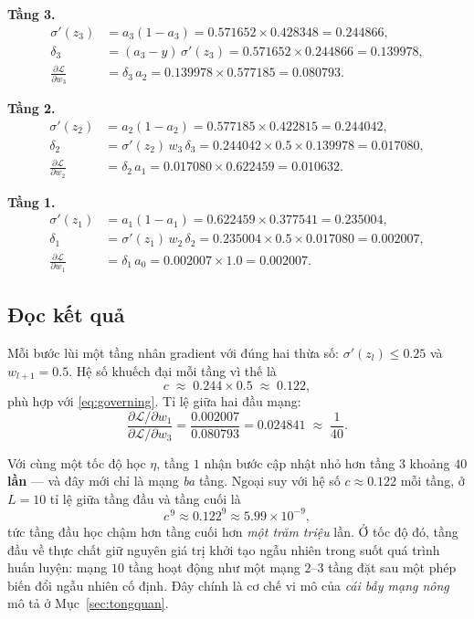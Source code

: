 \medskip
\noindent\textbf{Tầng 3.}
\begin{align*}
  \sigma'(z_3) &= a_3(1-a_3) = 0.571652\times 0.428348 = 0.244866,\\
  \delta_3 &= (a_3 - y)\,\sigma'(z_3) = 0.571652\times 0.244866 = 0.139978,\\
  \frac{\partial\mathcal{L}}{\partial w_3} &= \delta_3\, a_2
    = 0.139978\times 0.577185 = 0.080793 .
\end{align*}

\noindent\textbf{Tầng 2.}
\begin{align*}
  \sigma'(z_2) &= a_2(1-a_2) = 0.577185\times 0.422815 = 0.244042,\\
  \delta_2 &= \sigma'(z_2)\, w_3\, \delta_3
    = 0.244042\times 0.5\times 0.139978 = 0.017080,\\
  \frac{\partial\mathcal{L}}{\partial w_2} &= \delta_2\, a_1
    = 0.017080\times 0.622459 = 0.010632 .
\end{align*}

\noindent\textbf{Tầng 1.}
\begin{align*}
  \sigma'(z_1) &= a_1(1-a_1) = 0.622459\times 0.377541 = 0.235004,\\
  \delta_1 &= \sigma'(z_1)\, w_2\, \delta_2
    = 0.235004\times 0.5\times 0.017080 = 0.002007,\\
  \frac{\partial\mathcal{L}}{\partial w_1} &= \delta_1\, a_0
    = 0.002007\times 1.0 = 0.002007 .
\end{align*}

\subsection{Đọc kết quả}

Mỗi bước lùi một tầng nhân gradient với đúng hai thừa số: $\sigma'(z_l) \le 0.25$
và $w_{l+1} = 0.5$. Hệ số khuếch đại mỗi tầng vì thế là
\[
  c \;\approx\; 0.244 \times 0.5 \;\approx\; 0.122 ,
\]
phù hợp với \eqref{eq:governing}. Tỉ lệ giữa hai đầu mạng:
\[
  \frac{\partial\mathcal{L}/\partial w_1}{\partial\mathcal{L}/\partial w_3}
  = \frac{0.002007}{0.080793}
  = 0.024841
  \;\approx\; \frac{1}{40} .
\]

Với cùng một tốc độ học $\eta$, tầng $1$ nhận bước cập nhật nhỏ hơn tầng $3$
khoảng \textbf{$40$ lần} --- và đây mới chỉ là mạng \emph{ba} tầng. Ngoại suy với
hệ số $c \approx 0.122$ mỗi tầng, ở $L = 10$ tỉ lệ giữa tầng đầu và tầng cuối là
\[
  c^{\,9} \approx 0.122^{9} \approx 5.99\times10^{-9},
\]
tức tầng đầu học chậm hơn tầng cuối hơn \emph{một trăm triệu} lần. Ở tốc độ đó,
tầng đầu về thực chất giữ nguyên giá trị khởi tạo ngẫu nhiên trong suốt quá trình
huấn luyện: mạng $10$ tầng hoạt động như một mạng $2$--$3$ tầng đặt sau một phép
biến đổi ngẫu nhiên cố định. Đây chính là cơ chế vi mô của \emph{cái bẫy mạng
nông} mô tả ở Mục~\ref{sec:tongquan}.

